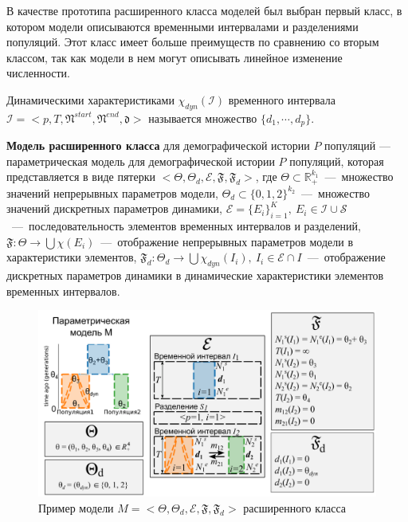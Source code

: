 \documentclass[a4paper,14pt,oneside,openany,article]{memoir}
\begin{document}
В качестве прототипа расширенного класса моделей был выбран первый класс, в котором модели описываются временными интервалами и разделениями популяций.
Этот класс имеет больше преимуществ по сравнению со вторым классом, так как модели в нем могут описывать линейное изменение численности.

 Динамическими характеристиками $\chi_{dyn}(\mathcal{I})$ временного интервала $\mathcal{I} = <p, T, \mathfrak{N}^{start}, \mathfrak{N}^{end}, \mathfrak{d}>$ называется множество
$\{d_1, \cdots, d_p\}$.

 \textbf{Модель расширенного класса} для демографической истории $P$ популяций --- параметрическая модель для демографической истории $P$ популяций, которая представляется в виде пятерки $<\Theta, \Theta_d, \mathcal{E}, \mathfrak{F}, \mathfrak{F}_{d}>$, где $\Theta \subset \mathbb{R}_+^{k_1}$~---~множество значений непрерывных параметров модели, $\Theta_d \subset \{0, 1, 2\}^{k_2}$~---~множество значений дискретных параметров динамики, $\mathcal{E} = \{E_i\}_{i=1}^K,\ E_i \in \mathcal{I} \cup \mathcal{S}$~---~последовательность элементов временных интервалов и разделений, $\mathfrak{F}: \Theta \to  \bigcup \chi(E_i)$~---~отображение непрерывных параметров модели в характеристики элементов, $\mathfrak{F}_d: \Theta_d \to  \bigcup \chi_{dyn}(I_i),\ I_i \in \mathcal{E} \cap I$~---~отображение дискретных параметров динамики в динамические характеристики элементов временных интервалов.

\begin{figure}[h]
    \centering
    \includegraphics[width=\textwidth]{images_2/model_3_type.pdf}
    \caption{Пример модели $M = <\Theta, \Theta_d, \mathcal{E}, \mathfrak{F}, \mathfrak{F}_{d}>$ расширенного класса}
    \label{fig:model_3_type}
\end{figure}
\end{document}
